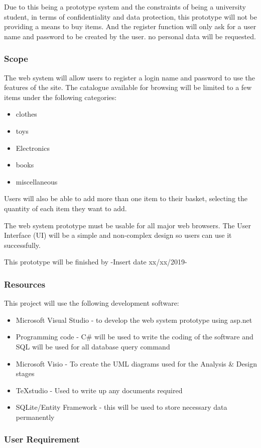 Due to this being a prototype system and the constraints of being a university student, in terms of confidentiality and data protection, this prototype will not be providing a means to buy items. And the register function will only ask for a user name and password to be created by the user. no personal data will be requested.
\subsubsection{Scope}
The web system will allow users to register a login name and password to use the features of the site. The catalogue available for browsing will be limited to a few items under the following categories:
\begin{itemize}
	\item clothes 
	\item toys  
	\item Electronics 
	\item books 
	\item miscellaneous
\end{itemize}
Users will also be able to add more than one item to their basket, selecting the quantity of each item they want to add.

The web system prototype must be usable for all major web browsers. The User Interface (UI) will be a simple and non-complex design so users can use it successfully.

This prototype will be finished by -Insert date xx/xx/2019- 
\subsubsection{Resources}
This project will use the following development software:
\begin{itemize}
	\item Microsoft Visual Studio - to develop the web system prototype using asp.net
	\item Programming code - C\# will be used to write the coding of the software and SQL will be used for all database query command
	\item Microsoft Visio - To create the UML diagrams used for the Analysis \& Design stages
	\item TeXstudio - Used to write up any documents required
	\item SQLite/Entity Framework - this will be used to store necessary data permanently
\end{itemize}
\subsubsection{User Requirement}

